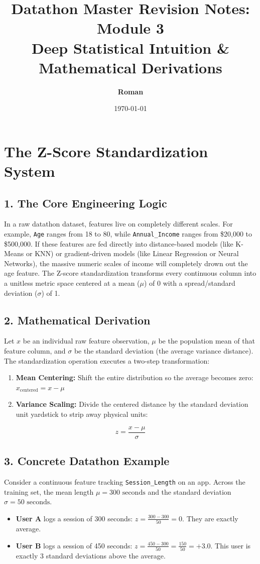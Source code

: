 \documentclass[12pt,a4paper]{article}
\title{\textbf{\color{primary}Datathon Master Revision Notes: Module 3 \\ Deep Statistical Intuition \& Mathematical Derivations}}
\author{\textbf{Roman}}
\date{\today}
\begin{document}
\color{darktext}
\maketitle

\section{The Z-Score Standardization System}
\subsection*{1. The Core Engineering Logic}
In a raw datathon dataset, features live on completely different scales. For example, \texttt{Age} ranges from 18 to 80, while \texttt{Annual\_Income} ranges from \$20,000 to \$500,000. If these features are fed directly into distance-based models (like K-Means or KNN) or gradient-driven models (like Linear Regression or Neural Networks), the massive numeric scales of income will completely drown out the age feature. The Z-score standardization transforms every continuous column into a unitless metric space centered at a mean ($\mu$) of 0 with a spread/standard deviation ($\sigma$) of 1.

\subsection*{2. Mathematical Derivation}
Let $x$ be an individual raw feature observation, $\mu$ be the population mean of that feature column, and $\sigma$ be the standard deviation (the average variance distance). 
The standardization operation executes a two-step transformation:
\begin{enumerate}
    \item \textbf{Mean Centering:} Shift the entire distribution so the average becomes zero: $x_{\text{centered}} = x - \mu$
    \item \textbf{Variance Scaling:} Divide the centered distance by the standard deviation unit yardstick to strip away physical units:
\end{enumerate}
$$z = \frac{x - \mu}{\sigma}$$

\subsection*{3. Concrete Datathon Example}
Consider a continuous feature tracking \texttt{Session\_Length} on an app. Across the training set, the mean length $\mu = 300\text{ seconds}$ and the standard deviation $\sigma = 50\text{ seconds}$. 
\begin{itemize}
    \item \textbf{User A} logs a session of 300 seconds: $z = \frac{300 - 300}{50} = 0$. They are exactly average.
    \item \textbf{User B} logs a session of 450 seconds: $z = \frac{450 - 300}{50} = \frac{150}{50} = +3.0$. This user is exactly 3 standard deviations above the average.
\end{itemize}
\end{document}
